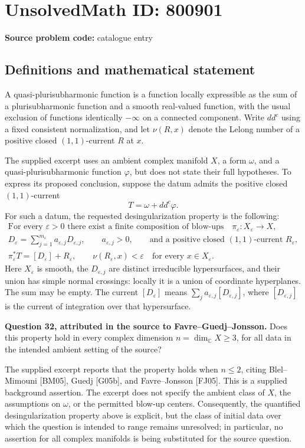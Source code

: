 \documentclass[11pt]{article}
\newcommand{\C}{\mathbb{C}}
\begin{document}
\section*{UnsolvedMath ID: 800901}
\textbf{Source problem code:} catalogue entry
\subsection{Definitions and mathematical statement}
A quasi-plurisubharmonic function is a function locally expressible as the sum of a plurisubharmonic function and a smooth real-valued function, with the usual exclusion of functions identically \(-\infty\) on a connected component. Write \(dd^c\) using a fixed consistent normalization, and let \(\nu(R,x)\) denote the Lelong number of a positive closed \((1,1)\)-current \(R\) at \(x\).

The supplied excerpt uses an ambient complex manifold \(X\), a form \(\omega\), and a quasi-plurisubharmonic function \(\varphi\), but does not state their full hypotheses. To express its proposed conclusion, suppose the datum admits the positive closed \((1,1)\)-current
\[
T=\omega+dd^c\varphi.
\]
For such a datum, the requested desingularization property is the following:
\[
\begin{gathered}
\text{For every }\varepsilon>0\text{ there exist a finite composition of blow-ups}\quad
\pi_\varepsilon:X_\varepsilon\longrightarrow X,\\
D_\varepsilon=\sum_{j=1}^{m_\varepsilon}a_{\varepsilon,j}D_{\varepsilon,j},
\qquad a_{\varepsilon,j}>0,
\qquad\text{and a positive closed }(1,1)\text{-current }R_\varepsilon,\\
\pi_\varepsilon^*T=[D_\varepsilon]+R_\varepsilon,
\qquad
\nu(R_\varepsilon,x)<\varepsilon\quad\text{for every }x\in X_\varepsilon.
\end{gathered}
\]
Here \(X_\varepsilon\) is smooth, the \(D_{\varepsilon,j}\) are distinct irreducible hypersurfaces, and their union has simple normal crossings: locally it is a union of coordinate hyperplanes. The sum may be empty. The current \([D_\varepsilon]\) means \(\sum_j a_{\varepsilon,j}[D_{\varepsilon,j}]\), where \([D_{\varepsilon,j}]\) is the current of integration over that hypersurface.

\textbf{Question 32, attributed in the source to Favre--Guedj--Jonsson.} Does this property hold in every complex dimension \(n=\dim_{\C}X\geq3\), for all data in the intended ambient setting of the source?

The supplied excerpt reports that the property holds when \(n\leq2\), citing Blel--Mimouni [BM05], Guedj [G05b], and Favre--Jonsson [FJ05]. This is a supplied background assertion. The excerpt does not specify the ambient class of \(X\), the assumptions on \(\omega\), or the permitted blow-up centers. Consequently, the quantified desingularization property above is explicit, but the class of initial data over which the question is intended to range remains unresolved; in particular, no assertion for all complex manifolds is being substituted for the source question.
\end{document}
